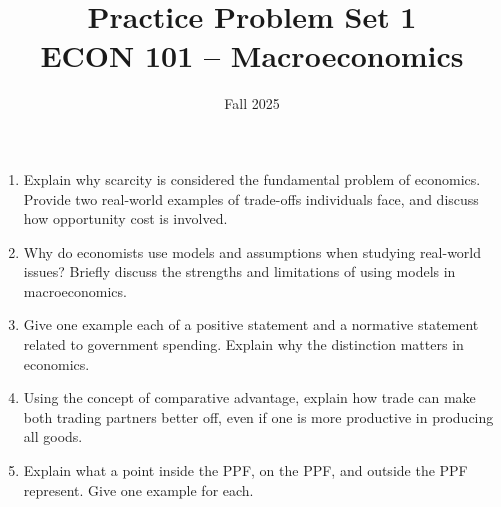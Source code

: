 \documentclass[12pt]{article}
\title{Practice Problem Set 1\\ \vspace{15pt} \large ECON 101 -- Macroeconomics}
\author{}
\date{Fall 2025}
\begin{document}
\maketitle



\begin{enumerate}
  \item 
  Explain why scarcity is considered the fundamental problem of economics. Provide two real-world examples of trade-offs individuals face, and discuss how opportunity cost is involved.

  \item 
  Why do economists use models and assumptions when studying real-world issues? Briefly discuss the strengths and limitations of using models in macroeconomics.

  \item
  Give one example each of a positive statement and a normative statement related to government spending. Explain why the distinction matters in economics.

  \item
  Using the concept of comparative advantage, explain how trade can make both trading partners better off, even if one is more productive in producing all goods.

  \item
  Explain what a point inside the PPF, on the PPF, and outside the PPF represent. Give one example for each.
\end{enumerate}
\end{document}
